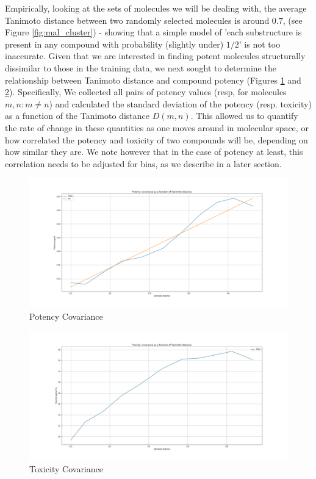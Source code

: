 \documentclass{article}
\begin{document}
\newline
\newline
Empirically, looking at the sets of molecules we will be dealing with, the average Tanimoto distance between two randomly selected molecules is around $0.7$, (see Figure \ref{fig:mal_cluster}) - showing that a simple model of 'each substructure is present in any compound with probability (slightly under) $1/2$' is not too inaccurate.
\newline
\newline
Given that we are interested in finding potent molecules structurally dissimilar to those in the training data, we next sought to determine the relationship between Tanimoto distance and compound potency (Figures \ref{fig:potcov} and \ref{fig:toxcov}). Specifically, We collected all pairs of potency values (resp, for molecules $m, n: m \neq n$) and calculated the standard deviation of the potency (resp. toxicity) as a function of the Tanimoto distance $D(m, n)$. This allowed us to quantify the rate of change in these quantities as one moves around in molecular space, or how correlated the potency and toxicity of two compounds will be, depending on how similar they are. We note however that in the case of potency at least, this correlation needs to be adjusted for bias, as we describe in a later section.

\begin{figure}[h!]
\centering
\includegraphics[width=\textwidth]{covariance.png}
\caption{Potency Covariance}
\label{fig:potcov}
\end{figure}

\begin{figure}[h!]
\centering
\includegraphics[width=\textwidth]{covariance.jpg}
\caption{Toxicity Covariance}
\label{fig:toxcov}
\end{figure}
\end{document}
